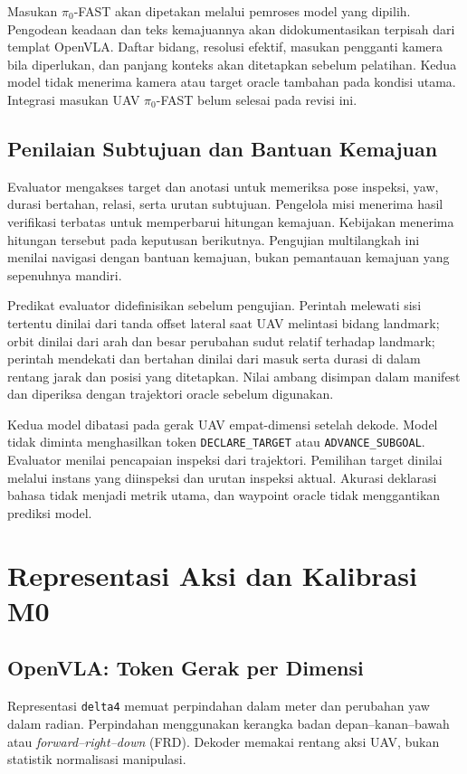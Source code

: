 Masukan $\pi_0$-FAST akan dipetakan melalui pemroses model yang dipilih. Pengodean keadaan dan teks kemajuannya akan didokumentasikan terpisah dari templat OpenVLA. Daftar bidang, resolusi efektif, masukan pengganti kamera bila diperlukan, dan panjang konteks akan ditetapkan sebelum pelatihan. Kedua model tidak menerima kamera atau target oracle tambahan pada kondisi utama. Integrasi masukan UAV $\pi_0$-FAST belum selesai pada revisi ini.

\subsection{Penilaian Subtujuan dan Bantuan Kemajuan}
\label{subsec:mission_feedback}
Evaluator mengakses target dan anotasi untuk memeriksa pose inspeksi, yaw, durasi bertahan, relasi, serta urutan subtujuan. Pengelola misi menerima hasil verifikasi terbatas untuk memperbarui hitungan kemajuan. Kebijakan menerima hitungan tersebut pada keputusan berikutnya. Pengujian multilangkah ini menilai navigasi dengan bantuan kemajuan, bukan pemantauan kemajuan yang sepenuhnya mandiri.

Predikat evaluator didefinisikan sebelum pengujian. Perintah melewati sisi tertentu dinilai dari tanda offset lateral saat UAV melintasi bidang landmark; orbit dinilai dari arah dan besar perubahan sudut relatif terhadap landmark; perintah mendekati dan bertahan dinilai dari masuk serta durasi di dalam rentang jarak dan posisi yang ditetapkan. Nilai ambang disimpan dalam manifest dan diperiksa dengan trajektori oracle sebelum digunakan.

Kedua model dibatasi pada gerak UAV empat-dimensi setelah dekode. Model tidak diminta menghasilkan token \texttt{DECLARE\_TARGET} atau \texttt{ADVANCE\_SUBGOAL}. Evaluator menilai pencapaian inspeksi dari trajektori. Pemilihan target dinilai melalui instans yang diinspeksi dan urutan inspeksi aktual. Akurasi deklarasi bahasa tidak menjadi metrik utama, dan waypoint oracle tidak menggantikan prediksi model.

\section{Representasi Aksi dan Kalibrasi M0}
\label{sec:aksi_uav}
\subsection{OpenVLA: Token Gerak per Dimensi}
Representasi \texttt{delta4} memuat perpindahan dalam meter dan perubahan yaw dalam radian. Perpindahan menggunakan kerangka badan depan--kanan--bawah atau \textit{forward--right--down} (FRD). Dekoder memakai rentang aksi UAV, bukan statistik normalisasi manipulasi.

